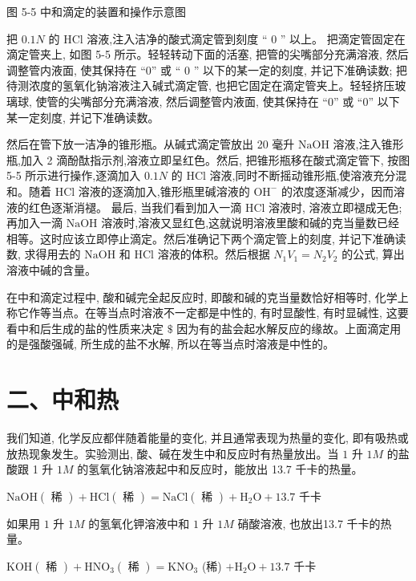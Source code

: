 \documentclass[10pt]{article}
\begin{document}
图 5-5 中和滴定的装置和操作示意图

把 \({0.1N}\) 的 \(\mathrm{{HCl}}\) 溶液,注入洁净的酸式滴定管到刻度 “ 0 ” 以上。 把滴定管固定在滴定管夹上, 如图 5-5 所示。轻轻转动下面的活塞, 把管的尖嘴部分充满溶液, 然后调整管内液面, 使其保持在 “0” 或 “ 0 ” 以下的某一定的刻度, 并记下准确读数; 把待测浓度的氢氧化钠溶液注入碱式滴定管, 也把它固定在滴定管夹上。轻轻挤压玻璃球, 使管的尖嘴部分充满溶液, 然后调整管内液面, 使其保持在 “0” 或 “0” 以下某一定刻度, 并记下准确读数。

然后在管下放一洁净的锥形瓶。从碱式滴定管放出 20 毫升 \(\mathrm{{NaOH}}\) 溶液,注入锥形瓶,加入 2 滴酚酞指示剂,溶液立即呈红色。然后, 把锥形瓶移在酸式滴定管下, 按图 5-5 所示进行操作,逐滴加入 \({0.1N}\) 的 \(\mathrm{{HCl}}\) 溶液,同时不断摇动锥形瓶,使溶液充分混和。随着 \(\mathrm{{HCl}}\) 溶液的逐滴加入,锥形瓶里碱溶液的 \({\mathrm{{OH}}}^{ - }\) 的浓度逐渐减少，因而溶液的红色逐渐消褪。 最后, 当我们看到加入一滴 HCl 溶液时, 溶液立即褪成无色; 再加入一滴 \(\mathrm{{NaOH}}\) 溶液时,溶液又显红色,这就说明溶液里酸和碱的克当量数已经相等。这时应该立即停止滴定。然后准确记下两个滴定管上的刻度, 并记下准确读数, 求得用去的 \(\mathrm{{NaOH}}\) 和 \(\mathrm{{HCl}}\) 溶液的体积。然后根据 \({N}_{1}{V}_{1} = {N}_{2}{V}_{2}\) 的公式, 算出溶液中碱的含量。

在中和滴定过程中, 酸和碱完全起反应时, 即酸和碱的克当量数恰好相等时, 化学上称它作等当点。在等当点时溶液不一定都是中性的, 有时显酸性, 有时显碱性, 这要看中和后生成的盐的性质来决定 \(\$\) 因为有的盐会起水解反应的缘故。上面滴定用的是强酸强碱, 所生成的盐不水解, 所以在等当点时溶液是中性的。

\section*{二、中和热}

我们知道, 化学反应都伴随着能量的变化, 并且通常表现为热量的变化, 即有吸热或放热现象发生。实验测出, 酸、碱在发生中和反应时有热量放出。当 \(1\) 升 \({1M}\) 的盐酸跟 1 升 \({1M}\) 的氢氧化钠溶液起中和反应时，能放出 13.7 千卡的热量。

\(\mathrm{{NaOH}}\left( \text{ 稀 }\right) + \mathrm{{HCl}}\left( \text{ 稀 }\right) = \mathrm{{NaCl}}\left( \text{ 稀 }\right) + {\mathrm{H}}_{2}\mathrm{O} + {13.7}\) 千卡

如果用 \(1\) 升 \({1M}\) 的氢氧化钾溶液中和 \(1\) 升 \({1M}\) 硝酸溶液, 也放出13.7 千卡的热量。

\(\mathrm{{KOH}}\left( \text{ 稀 }\right) + {\mathrm{{HNO}}}_{3}\left( \text{ 稀 }\right) = {\mathrm{{KNO}}}_{3}\) (稀) \(+ {\mathrm{H}}_{2}\mathrm{O} + {13.7}\) 千卡
\end{document}
